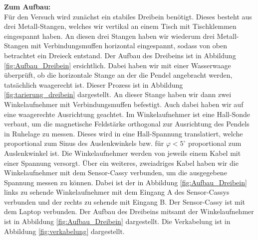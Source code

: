 \textbf{Zum Aufbau:} \\

Für den Versuch wird zunächst ein stabiles Dreibein benötigt. Dieses besteht aus drei Metall-Stangen, welches wir vertikal an einem Tisch mit Tischklemmen eingespannt haben. An diesen drei Stangen haben wir wiederum drei Metall-Stangen mit Verbindungsmuffen horizontal eingespannt, sodass von oben betrachtet ein Dreieck entstand. Der Aufbau des Dreibeins ist in Abbildung \ref{fig:Aufbau_Dreibein} ersichtlich. Dabei haben wir mit einer Wasserwaage überprüft, ob die horizontale Stange an der die Pendel angebracht werden, tatsächlich waagerecht ist. Dieser Prozess ist in Abbildung \ref{fig:tarierung_dreibein} dargestellt. An dieser Stange haben wir dann zwei Winkelaufnehmer mit Verbindungsmuffen befestigt. Auch dabei haben wir auf eine waagerechte Ausrichtung geachtet. Im Winkelaufnehmer ist eine Hall-Sonde verbaut, um die magnetische Feldstärke orthogonal zur Ausrichtung des Pendels in Ruhelage zu messen. Dieses wird in eine Hall-Spannung translatiert, welche proportional zum Sinus des Auslenkwinkels bzw. für $\varphi<5^\circ$ proportional zum Auslenkwinkel ist. Die Winkelaufnehmer werden von jeweils einem Kabel mit einer Spannung versorgt. Über ein weiteres, zweiadriges Kabel haben wir die Winkelaufnehmer mit dem Sensor-Cassy verbunden, um die ausgegebene Spannung messen zu können. Dabei ist der in Abbildung \ref{fig:Aufbau_Dreibein} links zu sehende Winkelaufnehmer mit dem Eingang A des Sensor-Cassys verbunden und der rechts zu sehende mit Eingang B. Der Sensor-Cassy ist mit dem Laptop verbunden. Der Aufbau des Dreibeins mitsamt der Winkelaufnehmer ist in Abbildung \ref{fig:Aufbau_Dreibein} dargestellt. Die Verkabelung ist in Abbildung \ref{fig:verkabelung} dargestellt. 

